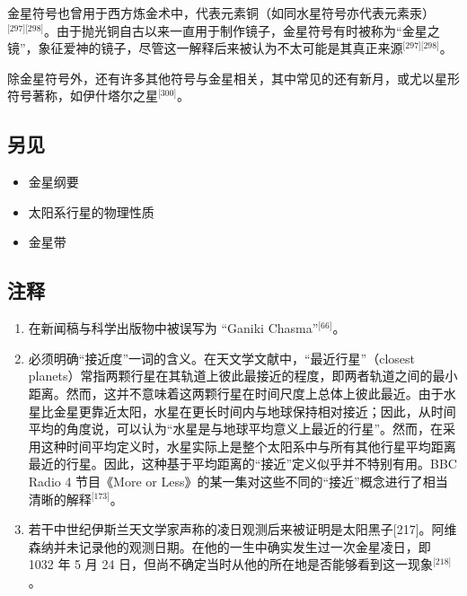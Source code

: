 金星符号也曾用于西方炼金术中，代表元素铜（如同水星符号亦代表元素汞）\(^\text{[297][298]}\)。由于抛光铜自古以来一直用于制作镜子，金星符号有时被称为“金星之镜”，象征爱神的镜子，尽管这一解释后来被认为不太可能是其真正来源\(^\text{[297][298]}\)。

除金星符号外，还有许多其他符号与金星相关，其中常见的还有新月，或尤以星形符号著称，如伊什塔尔之星\(^\text{[300]}\)。
\subsection{另见}
\begin{itemize}
\item 金星纲要  
\item 太阳系行星的物理性质  
\item 金星带 
\end{itemize} 
\subsection{注释 } 
\begin{enumerate}
\item 在新闻稿与科学出版物中被误写为 “Ganiki Chasma”\(^\text{[66]}\)。  
\item 必须明确“接近度”一词的含义。在天文学文献中，“最近行星”（closest planets）常指两颗行星在其轨道上彼此最接近的程度，即两者轨道之间的最小距离。然而，这并不意味着这两颗行星在时间尺度上总体上彼此最近。由于水星比金星更靠近太阳，水星在更长时间内与地球保持相对接近；因此，从时间平均的角度说，可以认为“水星是与地球平均意义上最近的行星”。然而，在采用这种时间平均定义时，水星实际上是整个太阳系中与所有其他行星平均距离最近的行星。因此，这种基于平均距离的“接近”定义似乎并不特别有用。BBC Radio 4 节目《More or Less》的某一集对这些不同的“接近”概念进行了相当清晰的解释\(^\text{[173]}\)。  
\item 若干中世纪伊斯兰天文学家声称的凌日观测后来被证明是太阳黑子[217]。阿维森纳并未记录他的观测日期。在他的一生中确实发生过一次金星凌日，即 1032 年 5 月 24 日，但尚不确定当时从他的所在地是否能够看到这一现象\(^\text{[218]}\)。
\end{enumerate}
